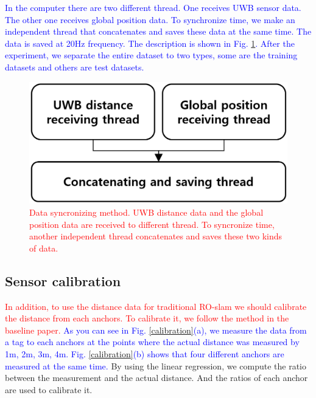 \documentclass[letterpaper, 10 pt, conference]{ieeeconf}  %
\begin{document}
 \textcolor{blue}{In the computer there are two different thread. One receives UWB sensor data. The other one receives global position data. To synchronize time, we make an independent thread that concatenates and saves these data at the same time. The data is saved at 20Hz frequency. The description is shown in Fig. \ref{fig:sync}. After the experiment, we separate the entire dataset to two types, some are the training datasets and others are test datasets.}

\begin{figure}[h]
	\centering
	\includegraphics[width=.9\linewidth]{figure2}
	\caption{\textcolor{red}{Data syncronizing method. UWB distance data and the global position data are received to different thread. To syncronize time, another independent thread concatenates and saves these two kinds of data.}}
	\label{fig:sync}
\end{figure}

\subsection{Sensor calibration}


 \textcolor{red}{In addition, to use the distance data for traditional RO-slam we should calibrate the distance from each anchors. To calibrate it, we follow the method in the baseline paper.} \textcolor{blue}{As you can see in Fig. \ref{calibration}(a), we measure the data from a tag to each anchors at the points where the actual distance was measured by 1m, 2m, 3m, 4m. Fig. \ref{calibration}(b) shows that four different anchors are measured at the same time.} By using the linear regression, we compute the ratio between the measurement and the actual distance. And the ratios of each anchor are used to calibrate it.
\end{document}
